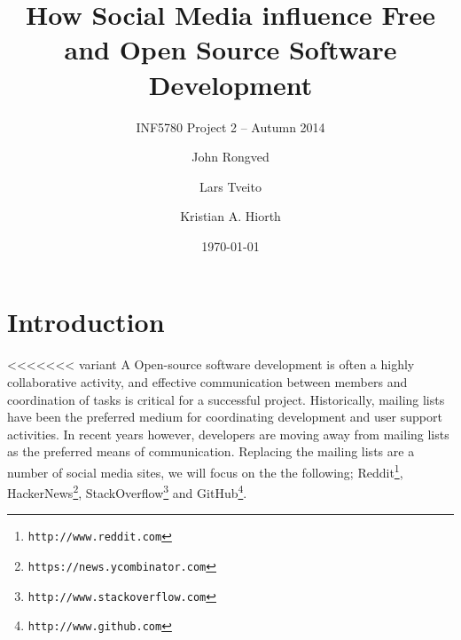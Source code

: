 \documentclass[a4paper,11pt]{article} %
\title{How Social Media influence Free and Open Source Software Development}
\subtitle{INF5780 Project 2 -- Autumn 2014}
\date{\today}
\author{John Rongved \and Lars Tveito \and Kristian A. Hiorth}
\begin{document}
\ififorside{}

\tableofcontents
\newpage

\section{Introduction}

<<<<<<< variant A
Open-source software development is often a highly collaborative activity,
and effective communication between members and coordination of tasks is
critical for a successful project.  Historically, mailing lists have been
the preferred medium for coordinating development and user support
activities\cite{Vasilescu14StackOverflow}. In recent years however,
developers are moving away from mailing lists as the preferred means of
communication.  Replacing the mailing lists are a number of social media
sites, we will focus on the the following;
Reddit\footnote{\texttt{http://www.reddit.com}},
HackerNews\footnote{\texttt{https://news.ycombinator.com}},
StackOverflow\footnote{\texttt{http://www.stackoverflow.com}} and
GitHub\footnote{\texttt{http://www.github.com}}.
\end{document}
